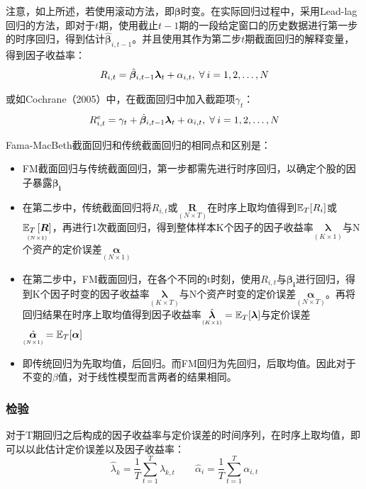 \documentclass[11pt]{article}
\begin{document}
注意，如上所述，若使用滚动方法，即$\bm{\beta}$时变。在实际回归过程中，采用Lead-lag回归的方法，即对于$t$期，使用截止$t-1$期的一段给定窗口的历史数据进行第一步的时序回归，得到估计$\hat{\bm{\beta}}_{i,t-1}$。并且使用其作为第二步$t$期截面回归的解释变量，得到因子收益率：
\begin{equation*}
    R_{i,t} = \hat{\bm{\beta}}_{i,t-1} \bm{\lambda}_t + \alpha_{i,t} \ilsep \forall i=1,2,\dots,N
\end{equation*}

或如Cochrane（2005）中，在截面回归中加入截距项$\gamma_t$：
\begin{equation*}
    R_{i,t}^{e} = \gamma_t + \hat{\bm{\beta}}_{i,t-1} \bm{\lambda}_t + \alpha_{i,t} \ilsep \forall i=1,2,\dots,N
\end{equation*}

Fama-MacBeth截面回归和传统截面回归的相同点和区别是：
\begin{itemize}
    \item FM截面回归与传统截面回归，第一步都需先进行时序回归，以确定个股的因子暴露$\bm{\beta_i}$
    \item 在第二步中，传统截面回归将$R_{i,t}$或$\underset{\scriptscriptstyle{(N \times T)}}{\bm{R}}$在时序上取均值得到$\mathbb{E}_T[R_i]$或$\underset{\scriptscriptstyle{(N \times 1)}}{\mathbb{E}_T\left[\bm{R}\right]}$，再进行1次截面回归，得到整体样本K个因子的因子收益率$\underset{\scriptscriptstyle{(K \times 1)}}{\bm{\lambda}}$与N个资产的定价误差$\underset{\scriptscriptstyle(N \times 1)}{\bm{\alpha}}$
    \item 在第二步中，FM截面回归，在各个不同的t时刻，使用$R_{i,t}$与$\bm{\beta_{i}}$进行回归，得到K个因子时变的因子收益率$\underset{\scriptscriptstyle{(K \times T)}}{\bm{\lambda}}$与N个资产时变的定价误差$\underset{\scriptscriptstyle(N \times T)}{\bm{\alpha}}$。再将回归结果在时序上取均值得到因子收益率$\underset{\scriptscriptstyle{(K \times 1)}}{\hat{\bm{\lambda}}} = \mathbb{E}_T[\bm{\lambda}]$与定价误差$\underset{\scriptscriptstyle{(N \times 1)}}{\hat{\bm{\alpha}}} = \mathbb{E}_T[\bm{\alpha}]$
    \item 即传统回归为先取均值，后回归。而FM回归为先回归，后取均值。因此对于不变的$\beta$值，对于线性模型而言两者的结果相同。
\end{itemize}

\subsubsection{检验}

对于T期回归之后构成的因子收益率与定价误差的时间序列，在时序上取均值，即可以以此估计定价误差以及因子收益率：
\begin{equation*}
    \hat{\lambda}_k = \frac{1}{T} \sum_{t=1}^{T} \lambda_{k,t}
    \qquad
    \hat{\alpha}_i = \frac{1}{T} \sum_{t=1}^{T} \alpha_{i,t}
\end{equation*}
\end{document}
